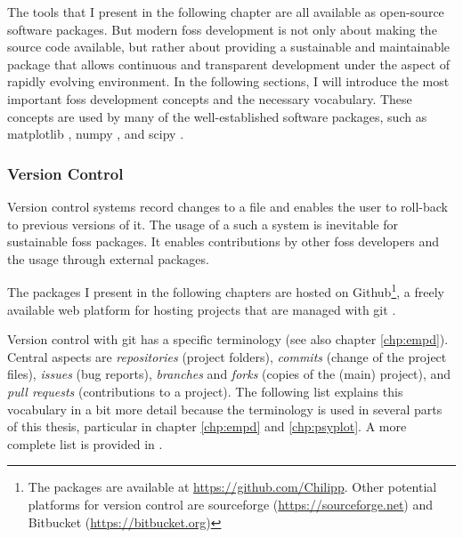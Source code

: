 \begin{refsection}
The tools that I present in the following chapter are all available as open-source software packages. But modern \gls{foss} development is not only about making the source code available, but rather about providing a sustainable and maintainable package that allows continuous and transparent development under the aspect of rapidly evolving environment. In the following sections, I will introduce the most important \gls{foss} development concepts \citep[e.g.][]{StoddenMiguez2014, Shaw2018} and the necessary vocabulary. These concepts are used by many of the well-established software packages, such as matplotlib \citep{Hunter2007}, numpy \citep{Oliphant2006}, and scipy \citep{JonesOliphantPetersonEtAl2001}.

\subsubsection{Version Control} \label{sec:intro-software-github}
Version control systems record changes to a file and enables the user to roll-back to previous versions of it. The usage of a such a system is inevitable for sustainable \gls{foss} packages. It enables contributions by other \gls{foss} developers and the usage through external packages.

The packages I present in the following chapters are hosted on Github\footnote{The packages are available at \url{https://github.com/Chilipp}. Other potential platforms for version control are sourceforge (\url{https://sourceforge.net}) and Bitbucket (\url{https://bitbucket.org})}, a freely available web platform for hosting projects that are managed with git \citep{ChaconStraubPGC2019}.

Version control with git has a specific terminology (see also chapter \ref{chp:empd}). Central aspects are \textit{repositories} (project folders), \textit{commits} (change of the project files), \textit{issues} (bug reports), \textit{branches} and \textit{forks} (copies of the (main) project), and \textit{pull requests} (contributions to a project). The following list explains this vocabulary in a bit more detail because the terminology is used in several parts of this thesis, particular in chapter \ref{chp:empd} and \ref{chp:psyplot}. A more complete list is provided in \cite{Github2019}.


\end{refsection}
